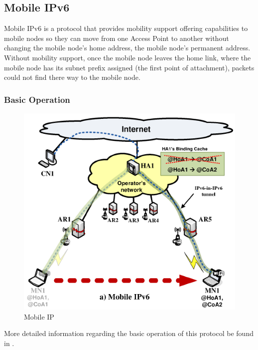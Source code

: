 \subsection{Mobile IPv6}\label{sec:chap2_dmm_mip}

Mobile IPv6 is a protocol that provides mobility support offering capabilities to mobile nodes so they can move from one Access Point to another without changing the mobile node's home address, the mobile node's permanent address. Without mobility support, once the mobile node leaves the home link, where the mobile node has its subnet prefix assigned (the first point of attachment), packets could not find there way to the mobile node. 

\subsubsection{Basic Operation}\label{sec:chap2_dmm_mip_bo}

\begin{center}
\begin{figure}[h!]
  \centering
    \includegraphics[scale=0.3]{./images/mip}
	\caption{Mobile IP}
	\label{mip-fig}
\end{figure}
\end{center}

More detailed information regarding the basic operation of this protocol be found in \cite{rfc_6275}.

